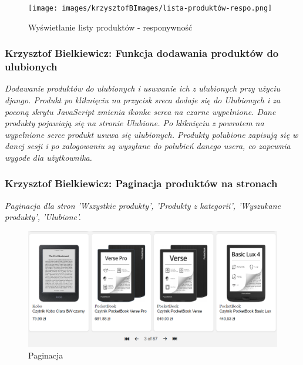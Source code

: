 \documentclass[12pt,a4paper,oneside]{article}
\theoremstyle{definition}
\numberwithin{equation}{section}
\begin{document}
\begin{figure}[H]
    \centering
    \texttt{[image: images/krzysztofBImages/lista-produktów-respo.png]}
    \caption{Wyświetlanie listy produktów - responywność}
\end{figure}



\subsubsection{Krzysztof Bielkiewicz: Funkcja dodawania produktów do ulubionych}
\label{1.3.14}
\textit{Dodawanie produktów do ulubionych i usuwanie ich z ulubionych przy użyciu django.
Produkt po kliknięciu na przycisk sreca dodaje się do Ulubionych i za poconą skrytu 
JavaScript zmienia ikonke serca na czarne wypełnione. Dane produkty pojawiają się na stronie Ulubione.
Po kliknięciu z powrotem na wypełnione serce produkt usuwa się ulubionych.
Produkty polubione zapisują się w danej sesji i po zalogowaniu są wysyłane do polubień danego usera,
co zapewnia wygode dla użytkownika.}


\subsubsection{Krzysztof Bielkiewicz: Paginacja produktów na stronach}
\label{1.3.15}
\textit{Paginacja dla stron 'Wszystkie produkty', 'Produkty z kategorii', 'Wyszukane produkty', 'Ulubione'.}
\begin{figure}[H]
    \centering
    \includegraphics[width=1.0\columnwidth]{images/krzysztofBImages/pagination.png}
    \caption{Paginacja}
\end{figure}
\end{document}
